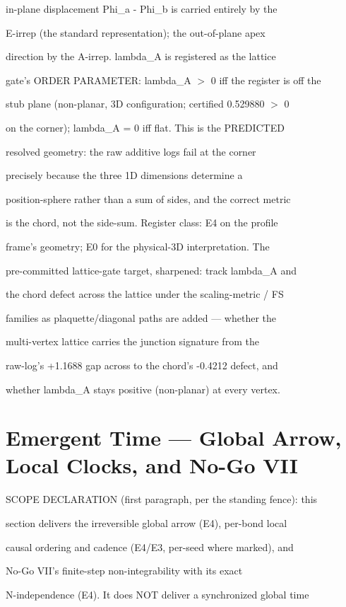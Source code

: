 \documentclass[11pt,a4paper]{article}
\theoremstyle{definition}
\begin{document}
in-plane displacement Phi\_a - Phi\_b is carried entirely by the

E-irrep (the standard representation); the out-of-plane apex

direction by the A-irrep. lambda\_A is registered as the lattice

gate's ORDER PARAMETER: lambda\_A $>$ 0 iff the register is off the

stub plane (non-planar, 3D configuration; certified 0.529880 $>$ 0

on the corner); lambda\_A = 0 iff flat. This is the PREDICTED

resolved geometry: the raw additive logs fail at the corner

precisely because the three 1D dimensions determine a

position-sphere rather than a sum of sides, and the correct metric

is the chord, not the side-sum. Register class: E4 on the profile

frame's geometry; E0 for the physical-3D interpretation. The

pre-committed lattice-gate target, sharpened: track lambda\_A and

the chord defect across the lattice under the scaling-metric / FS

families as plaquette/diagonal paths are added — whether the

multi-vertex lattice carries the junction signature from the

raw-log's +1.1688 gap across to the chord's -0.4212 defect, and

whether lambda\_A stays positive (non-planar) at every vertex.



\section{Emergent Time — Global Arrow, Local Clocks, and No-Go VII}

SCOPE DECLARATION (first paragraph, per the standing fence): this

section delivers the irreversible global arrow (E4), per-bond local

causal ordering and cadence (E4/E3, per-seed where marked), and

No-Go VII's finite-step non-integrability with its exact

N-independence (E4). It does NOT deliver a synchronized global time
\end{document}
